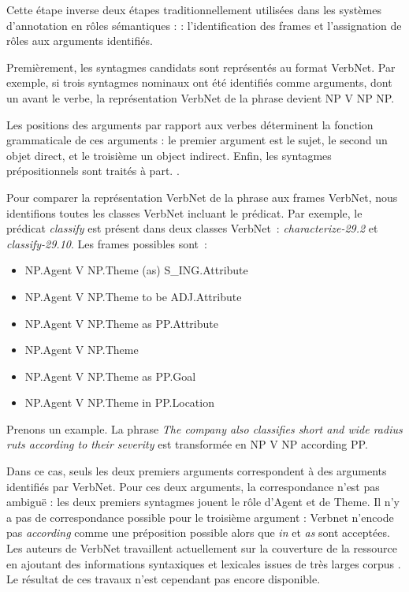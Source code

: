 Cette étape inverse deux étapes traditionnellement utilisées dans les systèmes
d'annotation en rôles sémantiques : \citep{gildea2002automatic,das2014frame} :
l'identification des frames et l'assignation de rôles aux arguments identifiés.

Premièrement, les syntagmes candidats sont représentés au format VerbNet. Par
exemple, si trois syntagmes nominaux ont été identifiés comme arguments, dont
un avant le verbe, la représentation VerbNet de la phrase devient NP V NP NP.

Les positions des arguments par rapport aux verbes déterminent la fonction
grammaticale de ces arguments : le premier argument est le sujet, le second un
objet direct, et le troisième un object indirect. Enfin, les syntagmes
prépositionnels sont traités à part. \citep{swier2005exploiting}.

Pour comparer la représentation VerbNet de la phrase aux frames VerbNet, nous
identifions toutes les classes VerbNet incluant le prédicat. Par exemple, le
prédicat \textit{classify} est présent dans deux classes VerbNet~:
\textit{characterize-29.2} et \textit{classify-29.10}. Les frames possibles
sont~:

\begin{itemize}
    \item NP.Agent V NP.Theme (as) S\_ING.Attribute
    \item NP.Agent V NP.Theme to be ADJ.Attribute
    \item NP.Agent V NP.Theme as PP.Attribute
    \item NP.Agent V NP.Theme
    \item NP.Agent V NP.Theme as PP.Goal
    \item NP.Agent V NP.Theme in PP.Location
\end{itemize}

Prenons un example. La phrase \emph{The company also classifies short and wide
radius ruts according to their severity} est transformée en NP V NP according
PP.

Dans ce cas, seuls les deux premiers arguments correspondent à des arguments
identifiés par VerbNet. Pour ces deux arguments, la correspondance n'est pas
ambiguë : les deux premiers syntagmes jouent le rôle d'Agent et de Theme.  Il
n'y a pas de correspondance possible pour le troisième argument : Verbnet
n'encode pas \emph{according} comme une préposition possible alors que
\emph{in} et \emph{as} sont acceptées. Les auteurs de VerbNet travaillent
actuellement sur la couverture de la ressource en ajoutant des informations
syntaxiques et lexicales issues de très larges corpus
\citep{bonial2013expanding}. Le résultat de ces travaux n'est cependant pas
encore disponible.

